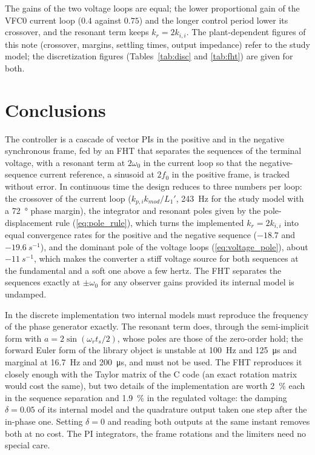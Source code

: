 \documentclass[10pt,a4paper]{scrartcl}
\newcommand{\ts}{t_s}
\newcommand{\wo}{\omega_0}
\newcommand{\wres}{\omega_r}
\newcommand{\kmod}{k_{mod}}
\newcommand{\kpi}{k_{p,i}}
\newcommand{\kii}{k_{i,i}}
\begin{document}
\begin{onehalfspace}
The gains of the two voltage loops are equal; the lower proportional gain of the VFC0 current loop ($0.4$ against $0.75$) and the longer control period lower its crossover, and the resonant term keeps $k_r = 2\kii$. The plant-dependent figures of this note (crossover, margins, settling times, output impedance) refer to the study model; the discretization figures (Tables~\ref{tab:disc} and \ref{tab:fht}) are given for both.

\section{Conclusions}

The controller is a cascade of vector PIs in the positive and in the negative synchronous frame, fed by an FHT that separates the sequences of the terminal voltage, with a resonant term at $2\wo$ in the current loop so that the negative-sequence current reference, a sinusoid at $2f_0$ in the positive frame, is tracked without error. In continuous time the design reduces to three numbers per loop: the crossover of the current loop ($\kpi\kmod/L_1'$, \SI{243}{Hz} for the study model with a \SI{72}{\degree} phase margin), the integrator and resonant poles given by the pole-displacement rule (\ref{eq:pole_rule}), which turns the implemented $k_r = 2\kii$ into equal convergence rates for the positive and the negative sequence ($-18.7$ and $\SI{-19.6}{s^{-1}}$), and the dominant pole of the voltage loops (\ref{eq:voltage_pole}), about $\SI{-11}{s^{-1}}$, which makes the converter a stiff voltage source for both sequences at the fundamental and a soft one above a few hertz. The FHT separates the sequences exactly at $\pm\wo$ for any observer gains provided its internal model is undamped.

In the discrete implementation two internal models must reproduce the frequency of the phase generator exactly. The resonant term does, through the semi-implicit form with $a = 2\sin(\wres\ts/2)$, whose poles are those of the zero-order hold; the forward Euler form of the library object is unstable at \SI{100}{Hz} and \SI{125}{\micro s} and marginal at \SI{16.7}{Hz} and \SI{200}{\micro s}, and must not be used. The FHT reproduces it closely enough with the Taylor matrix of the C code (an exact rotation matrix would cost the same), but two details of the implementation are worth \SI{2}{\percent} each in the sequence separation and \SI{1.9}{\percent} in the regulated voltage: the damping $\delta = 0.05$ of its internal model and the quadrature output taken one step after the in-phase one. Setting $\delta = 0$ and reading both outputs at the same instant removes both at no cost. The PI integrators, the frame rotations and the limiters need no special care.


\end{onehalfspace}
\end{document}
